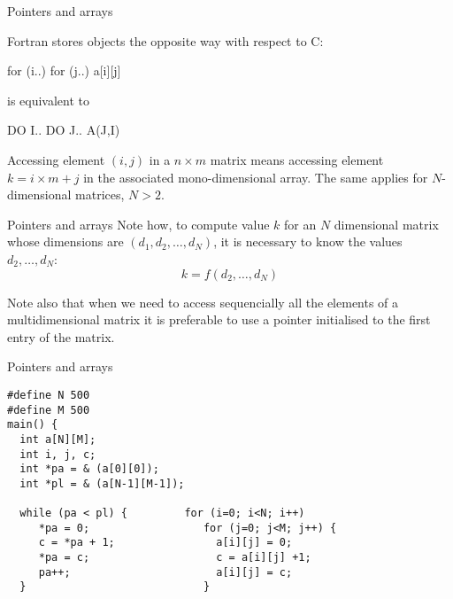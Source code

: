 \begin{frame}[fragile]{Pointers and arrays}

Fortran stores objects the opposite way with respect to C:

\begin{center}
for (i..) for (j..) a[i][j]
\end{center}

is equivalent to

\begin{center}
DO I.. DO J.. A(J,I)
\end{center}


\vspace{20pt}

Accessing element $(i,j)$ in a $n\times m$ matrix means accessing
element $k = i\times m + j$ in the associated mono-dimensional array.
The same applies for $N$-dimensional matrices, $N>2$.

\end{frame}
\begin{frame}[fragile]{Pointers and arrays}
Note how, to compute value $k$ for an $N$ dimensional matrix
whose dimensions are $(d_1, d_2,\dots,d_N)$,
it is necessary to know the values $d_2, \ldots, d_N$:
\[k = f(d_2, \dots, d_N) \]


\vspace{20pt}

Note also that when we need to access sequencially all the elements
of a multidimensional matrix it is preferable to use a pointer
initialised to the first entry of the matrix.

\end{frame}
\begin{frame}[fragile]{Pointers and arrays}
\begin{verbatim}
#define N 500
#define M 500
main() {
  int a[N][M];
  int i, j, c;
  int *pa = & (a[0][0]);
  int *pl = & (a[N-1][M-1]);

  while (pa < pl) {         for (i=0; i<N; i++)
     *pa = 0;                  for (j=0; j<M; j++) {
     c = *pa + 1;                a[i][j] = 0;
     *pa = c;                    c = a[i][j] +1;
     pa++;                       a[i][j] = c;
  }                            }
\end{verbatim}

\end{frame}

